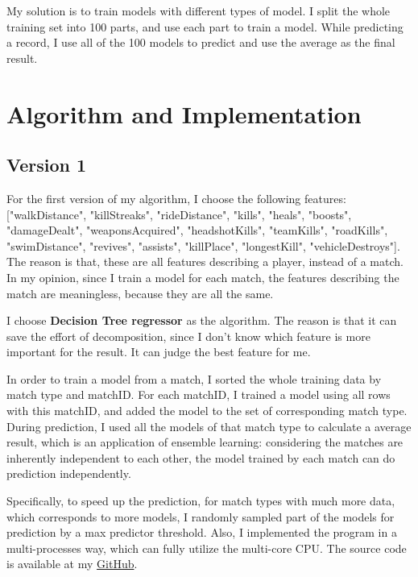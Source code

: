 \documentclass[journal=jacsat,manuscript=article]{achemso}
\begin{document}
My solution is to train models with different types of model. I split the whole training
set into 100 parts, and use each part to train a model. While predicting a record, I 
use all of the 100 models to predict and use the average as the final result.

\section{Algorithm and Implementation}

\subsection{Version 1}

For the first version of my algorithm, I choose the following features: ["walkDistance",
"killStreaks", "rideDistance", "kills", "heals", "boosts", "damageDealt", "weaponsAcquired",
"headshotKills", "teamKills", "roadKills", "swimDistance", "revives", "assists", "killPlace",
"longestKill", "vehicleDestroys"]. The reason is that, these are all features describing a 
player, instead of a match. In my opinion, since I train a model for each match, the features
describing the match are meaningless, because they are all the same.

I choose \textbf{Decision Tree regressor} as the algorithm. The reason is that it can 
save the effort of decomposition, since I don't know which feature is more important for 
the result. It can judge the best feature for me.

In order to train a model from a match, I sorted the whole training data by match type and matchID.
For each matchID, I trained a model using all rows with this matchID, and added the model to the 
set of corresponding match type. During prediction, I used all the models of that match type 
to calculate a average result, which is an application of ensemble learning: considering
the matches are inherently independent to each other, the model trained by each match 
can do prediction independently.

Specifically, to speed up the prediction, for match types with much more data, which corresponds
to more models, I randomly sampled part of the models for prediction by a max predictor threshold.
Also, I implemented the program in a multi-processes way, 
which can fully utilize the multi-core CPU. The source code is available at my
\href{https://github.com/mrdrivingduck/pugb-finish-placement-prediction/blob/master/src/main_multi_process_version.py}{GitHub}.
\end{document}
